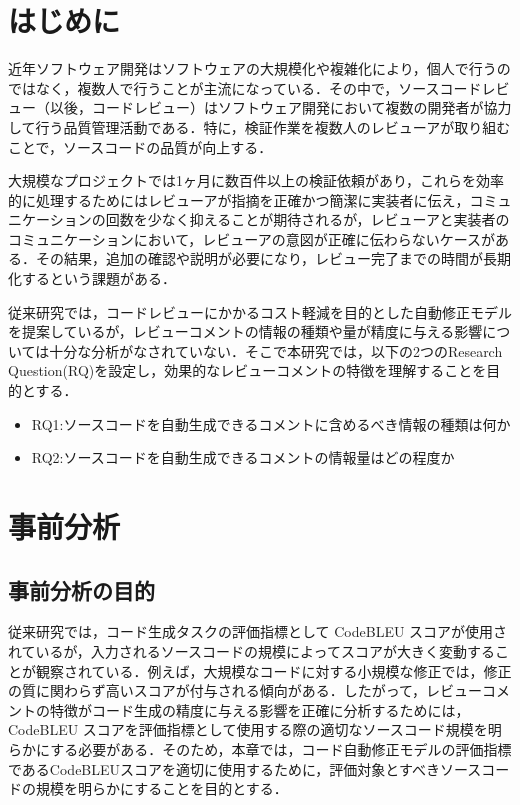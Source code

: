 \documentclass[twocolumn]{jarticle} %
\newcommand{\RQone}{ソースコードを自動生成できるコメントに含めるべき情報の種類は何か}
\newcommand{\RQtwo}{ソースコードを自動生成できるコメントの情報量はどの程度か}
\begin{document}
\maketitle
\thispagestyle{empty} %



\section{はじめに}

近年ソフトウェア開発はソフトウェアの大規模化や複雑化により，個人で行うのではなく，複数人で行うことが主流になっている．その中で，ソースコードレビュー（以後，コードレビュー）はソフトウェア開発において複数の開発者が協力して行う品質管理活動である．特に，検証作業を複数人のレビューアが取り組むことで，ソースコードの品質が向上する\cite{mcintosh2014impact}．

大規模なプロジェクトでは1ヶ月に数百件以上の検証依頼があり\cite{rigby2013convergent}，これらを効率的に処理するためにはレビューアが指摘を正確かつ簡潔に実装者に伝え，コミュニケーションの回数を少なく抑えることが期待されるが，レビューアと実装者のコミュニケーションにおいて，レビューアの意図が正確に伝わらないケースがある．その結果，追加の確認や説明が必要になり，レビュー完了までの時間が長期化するという課題がある．

従来研究\cite{tufano2022using}では，コードレビューにかかるコスト軽減を目的とした自動修正モデルを提案しているが，レビューコメントの情報の種類や量が精度に与える影響については十分な分析がなされていない．そこで本研究では，以下の2つのResearch Question(RQ)を設定し，効果的なレビューコメントの特徴を理解することを目的とする．
\begin{itemize}
\item RQ1:\RQone
\item RQ2:\RQtwo
\end{itemize}

\section{事前分析}

\subsection{事前分析の目的}

従来研究では，コード生成タスクの評価指標として CodeBLEU スコアが使用されているが，入力されるソースコードの規模によってスコアが大きく変動することが観察されている．例えば，大規模なコードに対する小規模な修正では，修正の質に関わらず高いスコアが付与される傾向がある．したがって，レビューコメントの特徴がコード生成の精度に与える影響を正確に分析するためには，CodeBLEU スコアを評価指標として使用する際の適切なソースコード規模を明らかにする必要がある．そのため，本章では，コード自動修正モデルの評価指標であるCodeBLEUスコアを適切に使用するために，評価対象とすべきソースコードの規模を明らかにすることを目的とする．
\end{document}
